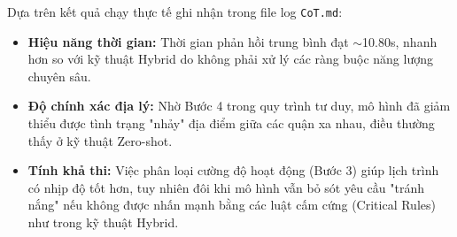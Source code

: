 Dựa trên kết quả chạy thực tế ghi nhận trong file log \texttt{CoT.md}:
\begin{itemize}
    \item \textbf{Hiệu năng thời gian:} Thời gian phản hồi trung bình đạt $\sim$10.80s, nhanh hơn so với kỹ thuật Hybrid do không phải xử lý các ràng buộc năng lượng chuyên sâu.
    \item \textbf{Độ chính xác địa lý:} Nhờ Bước 4 trong quy trình tư duy, mô hình đã giảm thiểu được tình trạng "nhảy" địa điểm giữa các quận xa nhau, điều thường thấy ở kỹ thuật Zero-shot.
    \item \textbf{Tính khả thi:} Việc phân loại cường độ hoạt động (Bước 3) giúp lịch trình có nhịp độ tốt hơn, tuy nhiên đôi khi mô hình vẫn bỏ sót yêu cầu "tránh nắng" nếu không được nhấn mạnh bằng các luật cấm cứng (Critical Rules) như trong kỹ thuật Hybrid.
\end{itemize}